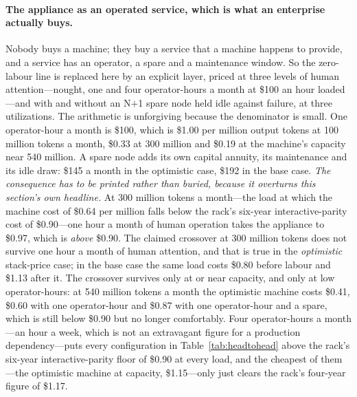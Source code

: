 \paragraph{The appliance as an operated service, which is what an enterprise actually buys.} Nobody buys a machine; they buy a service that a machine happens to provide, and a service has an operator, a spare and a maintenance window. So the zero-labour line is replaced here by an explicit layer, priced at three levels of human attention---nought, one and four operator-hours a month at \$100 an hour loaded---and with and without an N$+$1 spare node held idle against failure, at three utilizations. The arithmetic is unforgiving because the denominator is small. One operator-hour a month is \$100, which is \$1.00 per million output tokens at 100 million tokens a month, \$0.33 at 300 million and \$0.19 at the machine's capacity near 540 million. A spare node adds its own capital annuity, its maintenance and its idle draw: \$145 a month in the optimistic case, \$192 in the base case. \emph{The consequence has to be printed rather than buried, because it overturns this section's own headline.} At 300 million tokens a month---the load at which the machine cost of \$0.64 per million falls below the rack's six-year interactive-parity cost of \$0.90---one hour a month of human operation takes the appliance to \$0.97, which is \emph{above} \$0.90. The claimed crossover at 300 million tokens does not survive one hour a month of human attention, and that is true in the \emph{optimistic} stack-price case; in the base case the same load costs \$0.80 before labour and \$1.13 after it. The crossover survives only at or near capacity, and only at low operator-hours: at 540 million tokens a month the optimistic machine costs \$0.41, \$0.60 with one operator-hour and \$0.87 with one operator-hour and a spare, which is still below \$0.90 but no longer comfortably. Four operator-hours a month---an hour a week, which is not an extravagant figure for a production dependency---puts every configuration in Table~\ref{tab:headtohead} above the rack's six-year interactive-parity floor of \$0.90 at every load, and the cheapest of them---the optimistic machine at capacity, \$1.15---only just clears the rack's four-year figure of \$1.17.

